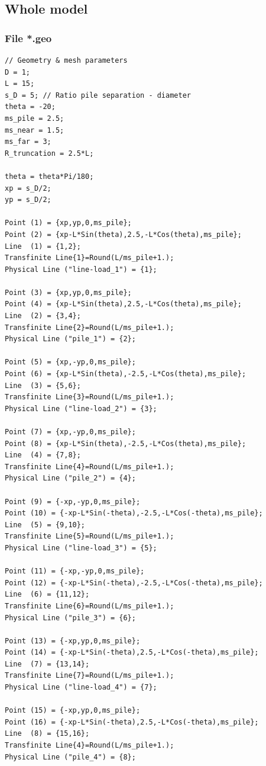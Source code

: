 \documentclass[a4]{article}
\begin{document}
\subsection{Whole model}

\subsubsection{File *.geo}

\begin{Verbatim}
// Geometry & mesh parameters
D = 1;
L = 15;
s_D = 5; // Ratio pile separation - diameter
theta = -20;
ms_pile = 2.5;
ms_near = 1.5;
ms_far = 3;
R_truncation = 2.5*L;

theta = theta*Pi/180; 
xp = s_D/2;           
yp = s_D/2;           

Point (1) = {xp,yp,0,ms_pile};
Point (2) = {xp-L*Sin(theta),2.5,-L*Cos(theta),ms_pile};
Line  (1) = {1,2};
Transfinite Line{1}=Round(L/ms_pile+1.);
Physical Line ("line-load_1") = {1};

Point (3) = {xp,yp,0,ms_pile};
Point (4) = {xp-L*Sin(theta),2.5,-L*Cos(theta),ms_pile};
Line  (2) = {3,4};
Transfinite Line{2}=Round(L/ms_pile+1.);
Physical Line ("pile_1") = {2};

Point (5) = {xp,-yp,0,ms_pile};
Point (6) = {xp-L*Sin(theta),-2.5,-L*Cos(theta),ms_pile};
Line  (3) = {5,6};
Transfinite Line{3}=Round(L/ms_pile+1.);
Physical Line ("line-load_2") = {3};

Point (7) = {xp,-yp,0,ms_pile};
Point (8) = {xp-L*Sin(theta),-2.5,-L*Cos(theta),ms_pile};
Line  (4) = {7,8};
Transfinite Line{4}=Round(L/ms_pile+1.);
Physical Line ("pile_2") = {4};

Point (9) = {-xp,-yp,0,ms_pile};
Point (10) = {-xp-L*Sin(-theta),-2.5,-L*Cos(-theta),ms_pile};
Line  (5) = {9,10};
Transfinite Line{5}=Round(L/ms_pile+1.);
Physical Line ("line-load_3") = {5};

Point (11) = {-xp,-yp,0,ms_pile};
Point (12) = {-xp-L*Sin(-theta),-2.5,-L*Cos(-theta),ms_pile};
Line  (6) = {11,12};
Transfinite Line{6}=Round(L/ms_pile+1.);
Physical Line ("pile_3") = {6};

Point (13) = {-xp,yp,0,ms_pile};
Point (14) = {-xp-L*Sin(-theta),2.5,-L*Cos(-theta),ms_pile};
Line  (7) = {13,14};
Transfinite Line{7}=Round(L/ms_pile+1.);
Physical Line ("line-load_4") = {7};

Point (15) = {-xp,yp,0,ms_pile};
Point (16) = {-xp-L*Sin(-theta),2.5,-L*Cos(-theta),ms_pile};
Line  (8) = {15,16};
Transfinite Line{4}=Round(L/ms_pile+1.);
Physical Line ("pile_4") = {8};


\end{Verbatim}
\end{document}
